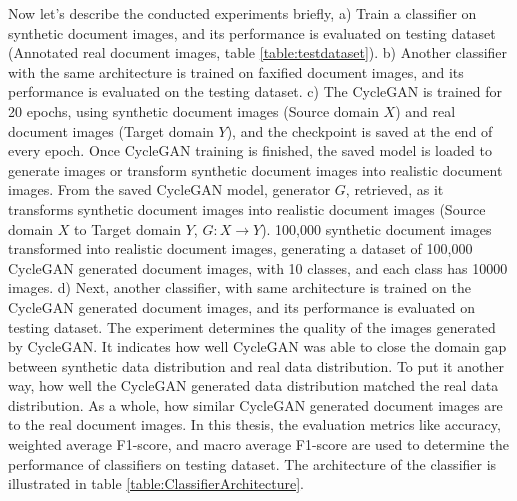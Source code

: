 Now let's describe the conducted experiments briefly, a) Train a classifier on synthetic document images, and its performance is evaluated on testing dataset (Annotated real document images, table \ref{table:testdataset}). b) Another classifier with the same architecture is trained on faxified document images, and its performance is evaluated on the testing dataset. c) The \ac{CycleGAN} is trained for 20 epochs, using synthetic document images (Source domain $X$) and real document images (Target domain $Y$), and the checkpoint is saved at the end of every epoch. Once \ac{CycleGAN} training is finished, the saved model is loaded to generate images or transform synthetic document images into realistic document images. From the saved \ac{CycleGAN} model, generator $G$, retrieved, as it transforms synthetic document images into realistic document images (Source domain $X$ to Target domain $Y$, $G: X \rightarrow Y$). 100,000 synthetic document images transformed into realistic document images, generating a dataset of 100,000 \ac{CycleGAN} generated document images, with 10 classes, and each class has 10000 images. d) Next, another classifier, with same architecture is trained on the \ac{CycleGAN} generated document images, and its performance is evaluated on testing dataset. The experiment determines the quality of the images generated by \ac{CycleGAN}. It indicates how well \ac{CycleGAN} was able to close the domain gap between synthetic data distribution and real data distribution. To put it another way, how well the \ac{CycleGAN} generated data distribution matched the real data distribution. As a whole, how similar \ac{CycleGAN} generated document images are to the real document images. In this thesis, the evaluation metrics like accuracy, weighted average F1-score, and macro average F1-score\cite{lipton2014thresholding} are used to determine the performance of classifiers on testing dataset. The architecture of the classifier is illustrated in table \ref{table:ClassifierArchitecture}.


